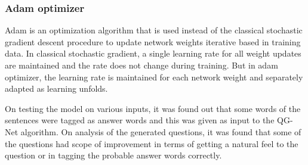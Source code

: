 \subsubsection{Adam optimizer}
Adam is an optimization algorithm that is used instead of the classical
stochastic gradient descent procedure to update network weights iterative based
in training data. In classical stochastic gradient, a single learning rate for
all weight updates are maintained and the rate does not change during training.
But in adam optimizer, the learning rate is maintained for each network weight
and separately adapted as learning unfolds.

On testing the model on various inputs, it was found out that some words of the
sentences were tagged as answer words and this was given as input to the QG-Net
algorithm. On analysis of the generated questions, it was found that some of the
questions had scope of improvement in terms of getting a natural feel to the
question or in tagging the probable answer words correctly.

